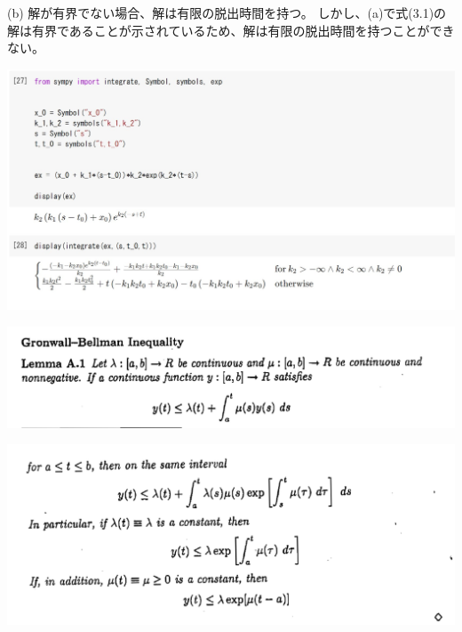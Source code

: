 \documentclass{jsarticle}
\begin{document}
(b) 解が有界でない場合、解は有限の脱出時間を持つ。
しかし、(a)で式(3.1)の解は有界であることが示されているため、解は有限の脱出時間を持つことができない。


\includegraphics[width=15cm]{integral.jpg}

\includegraphics[width=15cm]{A.1_1.png}

\includegraphics[width=15cm]{A.1_2.png}
\end{document}
